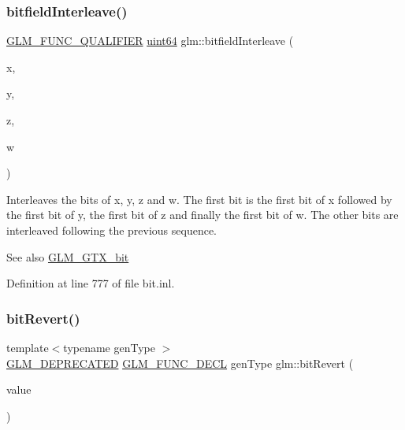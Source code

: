 \subsubsection{\texorpdfstring{bitfield\+Interleave()}{bitfieldInterleave()}\hspace{0.1cm}{\footnotesize\ttfamily [16/16]}}
{\footnotesize\ttfamily \hyperlink{setup_8hpp_a33fdea6f91c5f834105f7415e2a64407}{G\+L\+M\+\_\+\+F\+U\+N\+C\+\_\+\+Q\+U\+A\+L\+I\+F\+I\+ER} \hyperlink{group__gtc__type__precision_gae3632bf9b37da66233d78930dd06378a}{uint64} glm\+::bitfield\+Interleave (\begin{DoxyParamCaption}\item[{\hyperlink{group__gtc__type__precision_gad8c2939e1fdd8e5828b31d95c52255d5}{uint16}}]{x,  }\item[{\hyperlink{group__gtc__type__precision_gad8c2939e1fdd8e5828b31d95c52255d5}{uint16}}]{y,  }\item[{\hyperlink{group__gtc__type__precision_gad8c2939e1fdd8e5828b31d95c52255d5}{uint16}}]{z,  }\item[{\hyperlink{group__gtc__type__precision_gad8c2939e1fdd8e5828b31d95c52255d5}{uint16}}]{w }\end{DoxyParamCaption})}

Interleaves the bits of x, y, z and w. The first bit is the first bit of x followed by the first bit of y, the first bit of z and finally the first bit of w. The other bits are interleaved following the previous sequence.

\begin{DoxySeeAlso}{See also}
\hyperlink{group__gtx__bit}{G\+L\+M\+\_\+\+G\+T\+X\+\_\+bit} 
\end{DoxySeeAlso}


Definition at line 777 of file bit.\+inl.

\mbox{\label{group__gtx__bit_ga2d3939fbf96aa54cb2fd3461a60aba02}} 
\subsubsection{\texorpdfstring{bit\+Revert()}{bitRevert()}}
{\footnotesize\ttfamily template$<$typename gen\+Type $>$ \\
\hyperlink{setup_8hpp_a8edfb48cdc249a3ee48406bf179023dc}{G\+L\+M\+\_\+\+D\+E\+P\+R\+E\+C\+A\+T\+ED} \hyperlink{setup_8hpp_ab2d052de21a70539923e9bcbf6e83a51}{G\+L\+M\+\_\+\+F\+U\+N\+C\+\_\+\+D\+E\+CL} gen\+Type glm\+::bit\+Revert (\begin{DoxyParamCaption}\item[{gen\+Type const \&}]{value }\end{DoxyParamCaption})}

